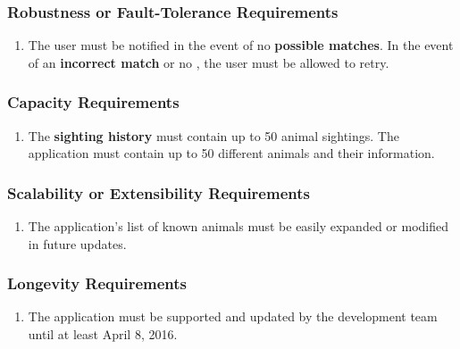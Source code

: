 \documentclass[]{article}
\begin{document}
\subsubsection{Robustness or Fault-Tolerance Requirements}
\label{ssub:robustness_or_fault_tolerance_requirements}
\begin{enumerate}[{PR}5. ]
	\item The user must be notified in the event of no \textbf{possible matches}. In the event of an \textbf{incorrect match} or no , the user must be allowed to retry.
\end{enumerate}

\subsubsection{Capacity Requirements}
\label{ssub:capacity_requirements}
\begin{enumerate}[{PR}6. ]
	\item The \textbf{sighting history} must contain up to 50 animal sightings. The application must contain up to 50 different animals and their information.
\end{enumerate}

\subsubsection{Scalability or Extensibility Requirements}
\label{ssub:scalability_or_extensibility_requirements}
\begin{enumerate}[{PR}7. ]
	\item The application's list of known animals must be easily expanded or modified in future updates.
\end{enumerate}

\subsubsection{Longevity Requirements}
\label{ssub:longevity_requirements}
\begin{enumerate}[{PR}8. ]
	\item The application must be supported and updated by the development team until at least April 8, 2016.
\end{enumerate}

\end{document}
